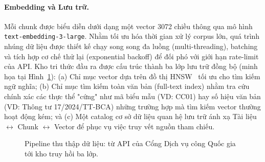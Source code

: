 \documentclass[11pt]{article}
\begin{document}
\paragraph{Embedding và Lưu trữ.}
Mỗi chunk được biểu diễn dưới dạng một vector 3072 chiều thông qua mô hình \texttt{text-embedding-3-large}. Nhằm tối ưu hóa thời gian xử lý corpus lớn, quá trình nhúng dữ liệu được thiết kế chạy song song đa luồng (multi-threading), batching và tích hợp cơ chế thử lại (exponential backoff) để đối phó với giới hạn rate-limit của API. Kho tri thức đầu ra được cấu trúc thành ba lớp lưu trữ đồng bộ (minh họa tại Hình~\ref{fig:pipeline}): (a) Chỉ mục vector dựa trên đồ thị HNSW~\citep{malkov2020hnsw} tối ưu cho tìm kiếm ngữ nghĩa; (b) Chỉ mục tìm kiếm toàn văn bản (full-text index) nhằm tra cứu chính xác các thực thể "cứng" như mã biểu mẫu (VD: CC01) hay số hiệu văn bản (VD: Thông tư 17/2024/TT-BCA) những trường hợp mà tìm kiếm vector thường hoạt động kém; và (c) Một catalog cơ sở dữ liệu quan hệ lưu trữ ánh xạ Tài liệu $\leftrightarrow$ Chunk $\leftrightarrow$ Vector để phục vụ việc truy vết nguồn tham chiếu.

\begin{figure}[H]
\centering
{}
\caption{Pipeline thu thập dữ liệu: từ API của Cổng Dịch vụ công Quốc gia tới kho truy hồi ba lớp.}
\label{fig:pipeline}
\end{figure}
\end{document}
